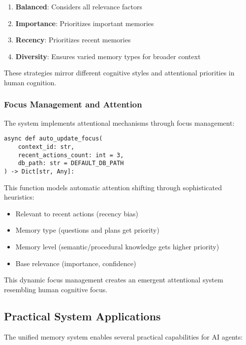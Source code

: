 \documentclass[12pt,a4paper]{article}
\begin{document}
\begin{enumerate}[label=\arabic*.]
    \item \textbf{Balanced}: Considers all relevance factors
    \item \textbf{Importance}: Prioritizes important memories
    \item \textbf{Recency}: Prioritizes recent memories
    \item \textbf{Diversity}: Ensures varied memory types for broader context
\end{enumerate}

These strategies mirror different cognitive styles and attentional priorities in human cognition.

\subsubsection*{Focus Management and Attention}

The system implements attentional mechanisms through focus management:
\begin{pageablecode}
\begin{verbatim}
async def auto_update_focus(
    context_id: str,
    recent_actions_count: int = 3,
    db_path: str = DEFAULT_DB_PATH
) -> Dict[str, Any]:
\end{verbatim}
\end{pageablecode}
This function models automatic attention shifting through sophisticated heuristics:
\begin{itemize}
    \item Relevant to recent actions (recency bias)
    \item Memory type (questions and plans get priority)
    \item Memory level (semantic/procedural knowledge gets higher priority)
    \item Base relevance (importance, confidence)
\end{itemize}

This dynamic focus management creates an emergent attentional system resembling human cognitive focus.

\subsection*{Practical System Applications}

The unified memory system enables several practical capabilities for AI agents:
\end{document}
